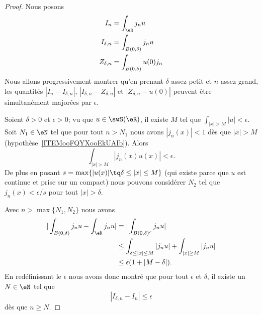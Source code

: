 \begin{proof}
	Nous posons
	\begin{subequations}
		\begin{align}
			I_n          & =\int_{\eR}j_nu            \\
			I_{\delta,n} & =\int_{B(0,\delta)}j_nu    \\
			Z_{\delta,n} & =\int_{B(0,\delta)}u(0)j_n
		\end{align}
	\end{subequations}
	Nous allons progressivement montrer qu'en prenant \( \delta\) assez petit et \( n\) assez grand, les quantités \( | I_n-I_{\delta,n} |\), \( | I_{\delta,n}-Z_{\delta,n}  |\) et \( | Z_{\delta,n}-u(0) |\) peuvent être simultanément majorées par \( \epsilon\).

	Soient \( \delta>0\) et \( \epsilon>0\); vu que \( u\in\swS(\eR)\), il existe \( M\) tel que \( \int_{| x |>M}| u |<\epsilon\). Soit \( N_1\in \eN\) tel que pour tout \( n>N_1\) nous avons \( | j_n(x) |<1\) dès que \( | x |>M\) (hypothèse~\ref{ITEMooFQYXooEkUAIb}). Alors
	\begin{equation}
		\int_{| x |>M}| j_n(x)u(x) |<\epsilon.
	\end{equation}
	De plus en posant \( s=\max\{ | u(x) |\tq \delta\leq | x |\leq M \}\) (qui existe parce que \( u\) est continue et prise sur un compact) nous pouvons considérer \( N_2\) tel que \( j_n(x)<\epsilon/s\) pour tout \( | x |>\delta\).

	Avec \( n>\max\{ N_1,N_2 \}\) nous avons
	\begin{subequations}
		\begin{align}
			| \int_{B(0,\delta)}j_nu-\int_{\eR}j_nu | & =| \int_{B(0,\delta)^c}j_nu |                                        \\
			                                          & \leq \int_{\delta\leq| x |\leq M}| j_nu |+\int_{| x |\geq M}| j_nu | \\
			                                          & \leq \epsilon(1+| M-\delta |).
		\end{align}
	\end{subequations}
	En redéfinissant le \( \epsilon\) nous avons donc montré que pour tout \( \epsilon\) et \( \delta\), il existe un \( N\in \eN\) tel que
	\begin{equation}
		| I_{\delta,n}-I_n |\leq \epsilon
	\end{equation}
	dès que \( n\geq N\).


\end{proof}
